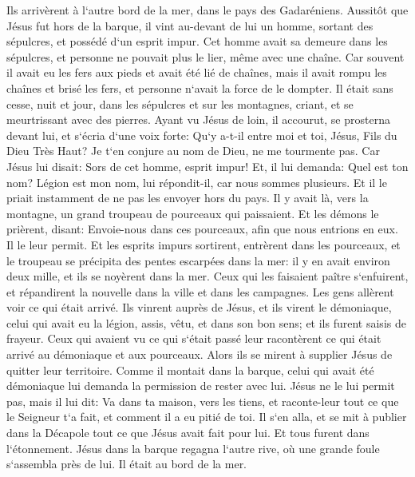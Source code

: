 \verse Ils arrivèrent à l`autre bord de la mer, dans le pays des Gadaréniens. 
\verse Aussitôt que Jésus fut hors de la barque, il vint au-devant de lui un homme, sortant des sépulcres, et possédé d`un esprit impur. 
\verse Cet homme avait sa demeure dans les sépulcres, et personne ne pouvait plus le lier, même avec une chaîne. 
\verse Car souvent il avait eu les fers aux pieds et avait été lié de chaînes, mais il avait rompu les chaînes et brisé les fers, et personne n`avait la force de le dompter. 
\verse Il était sans cesse, nuit et jour, dans les sépulcres et sur les montagnes, criant, et se meurtrissant avec des pierres. 
\verse Ayant vu Jésus de loin, il accourut, se prosterna devant lui, 
\verse et s`écria d`une voix forte: Qu`y a-t-il entre moi et toi, Jésus, Fils du Dieu Très Haut? Je t`en conjure au nom de Dieu, ne me tourmente pas. 
\verse Car Jésus lui disait: Sors de cet homme, esprit impur! 
\verse Et, il lui demanda: Quel est ton nom? Légion est mon nom, lui répondit-il, car nous sommes plusieurs. 
\verse Et il le priait instamment de ne pas les envoyer hors du pays. 
\verse Il y avait là, vers la montagne, un grand troupeau de pourceaux qui paissaient. 
\verse Et les démons le prièrent, disant: Envoie-nous dans ces pourceaux, afin que nous entrions en eux. 
\verse Il le leur permit. Et les esprits impurs sortirent, entrèrent dans les pourceaux, et le troupeau se précipita des pentes escarpées dans la mer: il y en avait environ deux mille, et ils se noyèrent dans la mer. 
\verse Ceux qui les faisaient paître s`enfuirent, et répandirent la nouvelle dans la ville et dans les campagnes. Les gens allèrent voir ce qui était arrivé. 
\verse Ils vinrent auprès de Jésus, et ils virent le démoniaque, celui qui avait eu la légion, assis, vêtu, et dans son bon sens; et ils furent saisis de frayeur. 
\verse Ceux qui avaient vu ce qui s`était passé leur racontèrent ce qui était arrivé au démoniaque et aux pourceaux. 
\verse Alors ils se mirent à supplier Jésus de quitter leur territoire. 
\verse Comme il montait dans la barque, celui qui avait été démoniaque lui demanda la permission de rester avec lui. 
\verse Jésus ne le lui permit pas, mais il lui dit: Va dans ta maison, vers les tiens, et raconte-leur tout ce que le Seigneur t`a fait, et comment il a eu pitié de toi. 
\verse Il s`en alla, et se mit à publier dans la Décapole tout ce que Jésus avait fait pour lui. Et tous furent dans l`étonnement. 
\verse Jésus dans la barque regagna l`autre rive, où une grande foule s`assembla près de lui. Il était au bord de la mer. 

